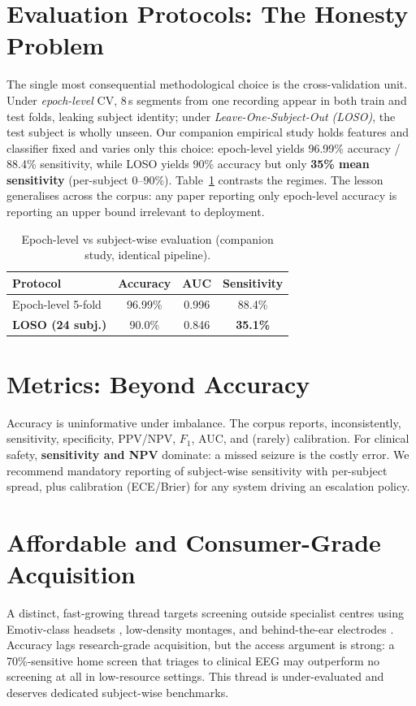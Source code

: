 \documentclass[10pt,journal,twocolumn]{IEEEtran}
\begin{document}
\section{Evaluation Protocols: The Honesty Problem}
The single most consequential methodological choice is the cross-validation unit. Under \emph{epoch-level} CV, 8\,s segments from one recording appear in both train and test folds, leaking subject identity; under \emph{Leave-One-Subject-Out (LOSO)}, the test subject is wholly unseen. Our companion empirical study holds features and classifier fixed and varies only this choice: epoch-level yields 96.99\% accuracy / 88.4\% sensitivity, while LOSO yields 90\% accuracy but only \textbf{35\% mean sensitivity} (per-subject 0--90\%). Table~\ref{tab:proto} contrasts the regimes. The lesson generalises across the corpus: any paper reporting only epoch-level accuracy is reporting an upper bound irrelevant to deployment.
\begin{table}[h]\centering\caption{Epoch-level vs subject-wise evaluation (companion study, identical pipeline).}\label{tab:proto}
\begin{tabular}{lccc}\toprule
Protocol & Accuracy & AUC & Sensitivity\\\midrule
Epoch-level 5-fold & 96.99\% & 0.996 & 88.4\%\\
\textbf{LOSO (24 subj.)} & 90.0\% & 0.846 & \textbf{35.1\%}\\\bottomrule
\end{tabular}\end{table}

\section{Metrics: Beyond Accuracy}
Accuracy is uninformative under imbalance. The corpus reports, inconsistently, sensitivity, specificity, PPV/NPV, $F_1$, AUC, and (rarely) calibration. For clinical safety, \textbf{sensitivity and NPV} dominate: a missed seizure is the costly error. We recommend mandatory reporting of subject-wise sensitivity with per-subject spread, plus calibration (ECE/Brier) for any system driving an escalation policy.

\section{Affordable and Consumer-Grade Acquisition}
A distinct, fast-growing thread targets screening outside specialist centres using Emotiv-class headsets \citep{ep251101879,ep220706914}, low-density montages, and behind-the-ear electrodes \citep{ep260611970}. Accuracy lags research-grade acquisition, but the access argument is strong: a 70\%-sensitive home screen that triages to clinical EEG may outperform no screening at all in low-resource settings. This thread is under-evaluated and deserves dedicated subject-wise benchmarks.
\end{document}
